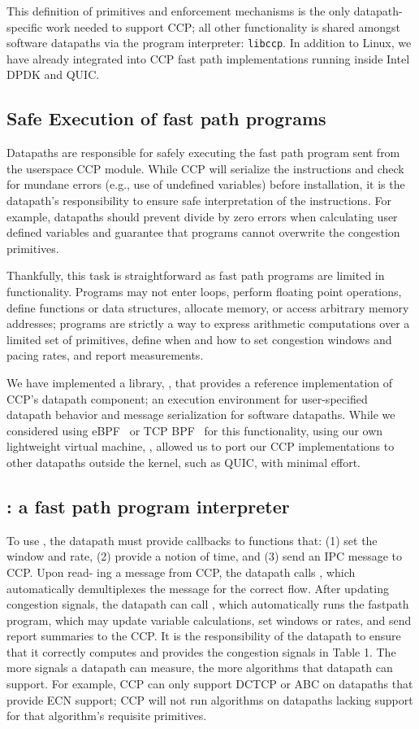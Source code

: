This definition of primitives and enforcement mechanisms is the only datapath-specific
work needed to support CCP; all other functionality is shared amongst software datapaths
via the program interpreter: \texttt{libccp}. In addition to Linux, we have already integrated
 into CCP fast path implementations running inside Intel DPDK and
QUIC.

\subsection{Safe Execution of fast path programs}
\label{s:datapath:fold}
Datapaths are responsible for safely executing the fast path program sent from the userspace CCP module. While CCP will serialize the instructions and check for mundane errors (e.g., use of undefined variables) before installation, it is the datapath’s responsibility to ensure safe interpretation of the instructions. For example, datapaths should prevent divide by zero errors when calculating user defined variables and guarantee that programs cannot overwrite the congestion primitives.

Thankfully, this task is straightforward as fast path programs are limited in functionality.
Programs may not enter loops, perform floating point operations, define functions or data structures, allocate memory, or access arbitrary memory addresses; programs are strictly a way to express arithmetic computations over a limited set of primitives, define when and how to set congestion windows and pacing rates, and report measurements.

We have implemented a library, , that provides a reference
implementation of CCP's datapath component; \ie an execution environment for
user-specified datapath behavior and message serialization for software
datapaths. While we considered using eBPF~\cite{ebpf} or TCP BPF~\cite{tcpbpf}
for this functionality, using our own lightweight virtual machine, ,
allowed us to port our CCP implementations to other datapaths outside the
kernel, such as QUIC, with minimal effort.

\subsection{: a fast path program interpreter}
\label{s:datapath:libccp}
To use , the datapath must provide callbacks to functions that: (1) set the window and rate, (2) provide a notion of time, and (3) send an IPC message to CCP. Upon read- ing a message from CCP, the datapath calls , which automatically demultiplexes the message for the correct flow. After updating congestion signals, the datapath can call , which automatically runs the fastpath program, which may update variable calculations, set windows or rates, and send report summaries to the CCP. It is the responsibility of the datapath to ensure that it correctly computes and provides the congestion signals in Table 1.
The more signals a datapath can measure, the more algorithms that datapath can support. For example, CCP can only support DCTCP \cite{DCTCP} or ABC \cite{abc} on datapaths that provide ECN support; CCP will not run algorithms on datapaths lacking support for that algorithm’s requisite primitives.
